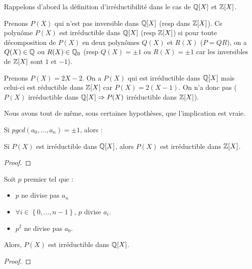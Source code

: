 Rappelons d'abord la définition d'irréductibilité dans le cas de $\mathbb{Q}[X]$
et $\mathbb{Z}[X]$.

Prenons $P(X)$ qui n'est pas inversible dans $\mathbb{Q}[X]$ (resp dans
$\mathbb{Z}[X]$).
Ce polynôme $P(X)$ est irréductible dans $\mathbb{Q}[X]$ (resp $\mathbb{Z}[X]$) si
pour toute décomposition de $P(X)$ en deux polynômes $Q(X)$ et $R(X)$ ($P =
QR$), on a $Q(X) \in \mathbb{Q}$ ou $R(X) \in \mathbb{Q}_{0}$ (resp $Q(X) = \pm 1$
ou $R(X) = \pm 1$ car les inversibles de $\mathbb{Z}[X]$ sont $1$ et $-1$).

Prenons $P(X) = 2X-2$. On a $P(X)$ qui est irréductible dans
$\mathbb{Q}[X]$ mais celui-ci est réductible dans $\mathbb{Z}[X]$ car $P(X) =
2(X-1)$. On n'a donc pas ($P(X)$ irréductible dans $\mathbb{Q}[X] \Rightarrow
P(X)$ irréductible dans $\mathbb{Z}[X]$).

Nous avons tout de même, sous certaines hypothèses, que l'implication est vraie.

\begin{proposition}
	Si $pgcd(a_{0}, \ldots, a_{n}) = \pm 1$, alors :

	Si $P(X)$ est irréductible dans $\mathbb{Q}[X]$, alors $P(X)$ est
	irréductible dans $\mathbb{Z}[X]$.
\end{proposition}

\begin{proof}
	
\end{proof}

\begin{theorem} 
	Soit $p$ premier tel que :

	\begin{itemize}
		\item $p$ ne divise pas $a_{n}$
		\item $\forall i \in \left\{ 0, \ldots, n - 1 \right\}$, $p$ divise
			$a_{i}$.
		\item $p^{2}$ ne divise pas $a_{0}$.
	\end{itemize}
	\label{critere_E}
	Alors, $P(X)$ est irréductible dans $\mathbb{Q}[X]$.
\end{theorem}

\begin{proof}
	
\end{proof}

